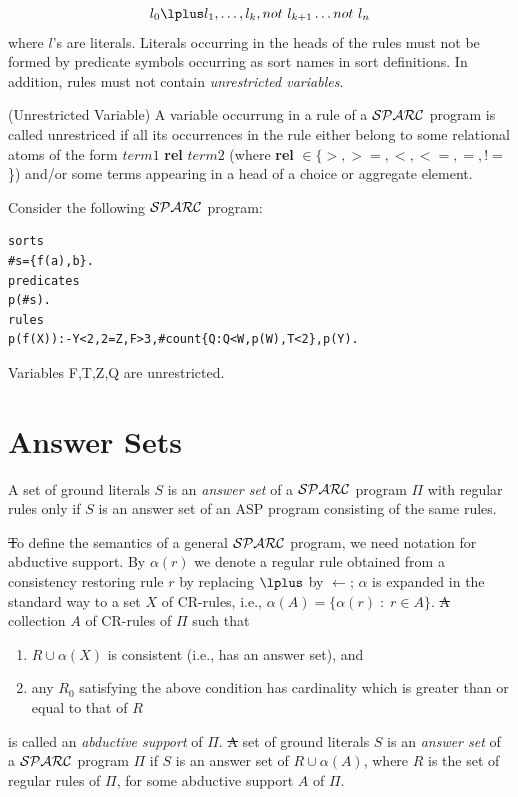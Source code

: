 \documentclass[12pt, letterpaper]{article}
\begin{document}
\begin{equation}
   [label:] l_0 \lplus l_1,  \ldots, l_k, not~l_{k+1} \ldots not~l_{n}
 \end{equation}
where $l$'s are literals.
Literals occurring in the heads of the rules must not be formed by predicate symbols
occurring as sort names in sort definitions. In addition, rules must not contain \textit{unrestricted variables}.

\begin{definition}(Unrestricted Variable)
 A variable occurrung in a rule of a ${\cal SPARC}$ program is called unrestriced if all its occurrences in the rule either belong to some relational atoms of the form 
$term1$ \textbf{rel} $term2$ (where \textbf{rel} $\in  \{>,>=,<,<=,=,!=$\})  and/or  some terms appearing in a head of a choice or aggregate element. 
\end{definition}
\begin{example}
\em{
 Consider the following ${\cal SPARC}$ program:
\begin{verbatim}
sorts
#s={f(a),b}.
predicates
p(#s).
rules
p(f(X)):-Y<2,2=Z,F>3,#count{Q:Q<W,p(W),T<2},p(Y).
\end{verbatim}
Variables F,T,Z,Q are unrestricted.
}  
\end{example}

 
\section{Answer Sets}
\noindent A set of ground literals $S$ is an {\em answer set} of a ${\cal SPARC}$ 
program $\Pi$ with regular rules only if $S$ is an answer set of an ASP program consisting of the same rules.

\st To define the semantics of a general ${\cal SPARC}$ program, we need notation for abductive support.
By $\alpha(r)$ we denote a regular rule
obtained from a consistency restoring rule $r$
by replacing $\lplus$ by $\leftarrow$;
$\alpha$ is expanded in the standard way to a set $X$ of CR-rules,
i.e., $\alpha(A) = \{\alpha(r)\; :\; r \in A\}$.
\st A %
collection $A$ of CR-rules of $\Pi$ such that 
\begin{enumerate}
\item $R \cup \alpha(X)$ is consistent (i.e., has an answer set), and
\item any $R_0$ satisfying the above condition has cardinality
which is greater than or equal to that of $R$
\end{enumerate}
is called an {\em abductive support} of $\Pi$.
\st A set of ground literals $S$ is an {\em answer set} of a ${\cal SPARC}$ program 
$\Pi$ if $S$ is an answer set of $R \cup \alpha(A)$, where $R$ is the set of regular rules of $\Pi$, for some abductive
support $A$ of $\Pi$.
\end{document}
